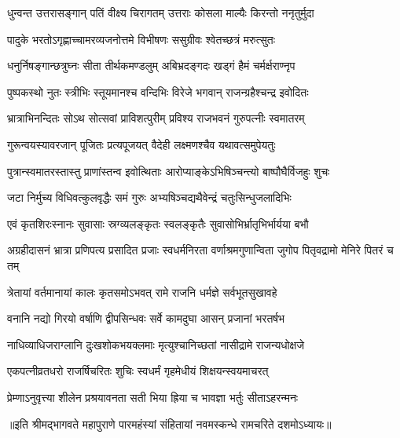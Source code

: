 \twolineshloka
{धुन्वन्त उत्तरासङ्गान् पतिं वीक्ष्य चिरागतम्}
{उत्तराः कोसला माल्यैः किरन्तो ननृतुर्मुदा} %

\twolineshloka
{पादुके भरतोऽगृह्णाच्चामरव्यजनोत्तमे}
{विभीषणः ससुग्रीवः श्वेतच्छत्रं मरुत्सुतः} %

\twolineshloka
{धनुर्निषङ्गान्छत्रुघ्नः सीता तीर्थकमण्डलुम्}
{अबिभ्रदङ्गदः खड्गं हैमं चर्मर्क्षराण्नृप} %

\twolineshloka
{पुष्पकस्थो नुतः स्त्रीभिः स्तूयमानश्च वन्दिभिः}
{विरेजे भगवान् राजन्ग्रहैश्चन्द्र इवोदितः} %

\twolineshloka
{भ्रात्राभिनन्दितः सोऽथ सोत्सवां प्राविशत्पुरीम्}
{प्रविश्य राजभवनं गुरुपत्नीः स्वमातरम्} %

\twolineshloka
{गुरून्वयस्यावरजान् पूजितः प्रत्यपूजयत्}
{वैदेही लक्ष्मणश्चैव यथावत्समुपेयतुः} %

\twolineshloka
{पुत्रान्स्वमातरस्तास्तु प्राणांस्तन्व इवोत्थिताः}
{आरोप्याङ्केऽभिषिञ्चन्त्यो बाष्पौघैर्विजहुः शुचः} %

\twolineshloka
{जटा निर्मुच्य विधिवत्कुलवृद्धैः समं गुरुः}
{अभ्यषिञ्चद्यथैवेन्द्रं चतुःसिन्धुजलादिभिः} %

\twolineshloka
{एवं कृतशिरःस्नानः सुवासाः स्रग्व्यलङ्कृतः}
{स्वलङ्कृतैः सुवासोभिर्भ्रातृभिर्भार्यया बभौ} %

\threelineshloka
{अग्रहीदासनं भ्रात्रा प्रणिपत्य प्रसादित}
{प्रजाः स्वधर्मनिरता वर्णाश्रमगुणान्विता}
{जुगोप पितृवद्रामो मेनिरे पितरं च तम्} %

\twolineshloka
{त्रेतायां वर्तमानायां कालः कृतसमोऽभवत्}
{रामे राजनि धर्मज्ञे सर्वभूतसुखावहे} %

\twolineshloka
{वनानि नद्यो गिरयो वर्षाणि द्वीपसिन्धवः}
{सर्वे कामदुघा आसन् प्रजानां भरतर्षभ} %

\twolineshloka
{नाधिव्याधिजराग्लानि दुःखशोकभयक्लमाः}
{मृत्युश्चानिच्छतां नासीद्रामे राजन्यधोक्षजे} %

\twolineshloka
{एकपत्नीव्रतधरो राजर्षिचरितः शुचिः}
{स्वधर्मं गृहमेधीयं शिक्षयन्स्वयमाचरत्} %

\twolineshloka
{प्रेम्णाऽनुवृत्त्या शीलेन प्रश्रयावनता सती}
{भिया ह्रिया च भावज्ञा भर्तुः सीताऽहरन्मनः} %

॥इति श्रीमद्भागवते महापुराणे पारमहंस्यां संहितायां नवमस्कन्धे रामचरिते दशमोऽध्यायः॥

\closesection